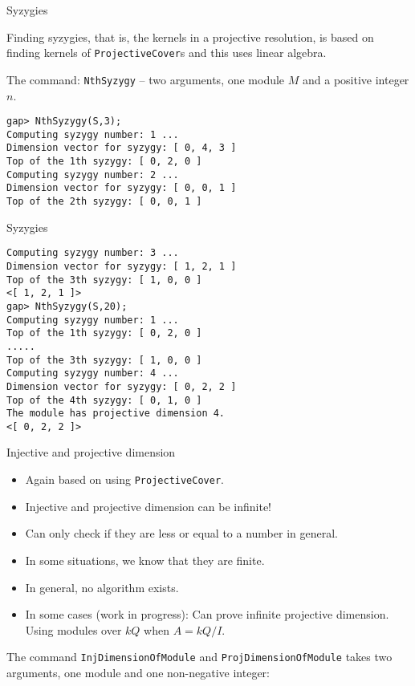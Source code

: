 \begin{frame}[fragile]{Syzygies}

Finding syzygies, that is, the kernels in a projective resolution, is
based on finding kernels of \texttt{ProjectiveCover}s and this uses
linear algebra.\medskip  

The command:  \texttt{NthSyzygy} -- two arguments, one module $M$ and a
positive integer $n$.  
\begin{verbatim}
gap> NthSyzygy(S,3);
Computing syzygy number: 1 ...
Dimension vector for syzygy: [ 0, 4, 3 ]
Top of the 1th syzygy: [ 0, 2, 0 ]
Computing syzygy number: 2 ...
Dimension vector for syzygy: [ 0, 0, 1 ]
Top of the 2th syzygy: [ 0, 0, 1 ]
\end{verbatim}
\end{frame}

\begin{frame}[fragile]{Syzygies}

\begin{verbatim}
Computing syzygy number: 3 ...
Dimension vector for syzygy: [ 1, 2, 1 ]
Top of the 3th syzygy: [ 1, 0, 0 ]
<[ 1, 2, 1 ]>
gap> NthSyzygy(S,20);
Computing syzygy number: 1 ...
Top of the 1th syzygy: [ 0, 2, 0 ]
.....
Top of the 3th syzygy: [ 1, 0, 0 ]
Computing syzygy number: 4 ...
Dimension vector for syzygy: [ 0, 2, 2 ]
Top of the 4th syzygy: [ 0, 1, 0 ]
The module has projective dimension 4.
<[ 0, 2, 2 ]>
\end{verbatim}
\end{frame}

\begin{frame}[fragile]{Injective and projective dimension}

\begin{itemize}
\item Again based on using \texttt{ProjectiveCover}.
\item Injective and projective dimension can be infinite!
\item Can only check if they are less or equal to a number in general.
\item In some situations, we know that they are finite.
\item In general, no algorithm exists.
\item In some cases (work in progress): Can prove infinite projective
dimension.  Using modules over $kQ$ when $A = kQ/I$.  
\end{itemize} 

The command \texttt{InjDimensionOfModule} and
\texttt{ProjDimensionOfModule} takes two arguments, one module and one
non-negative integer:
\end{frame}

